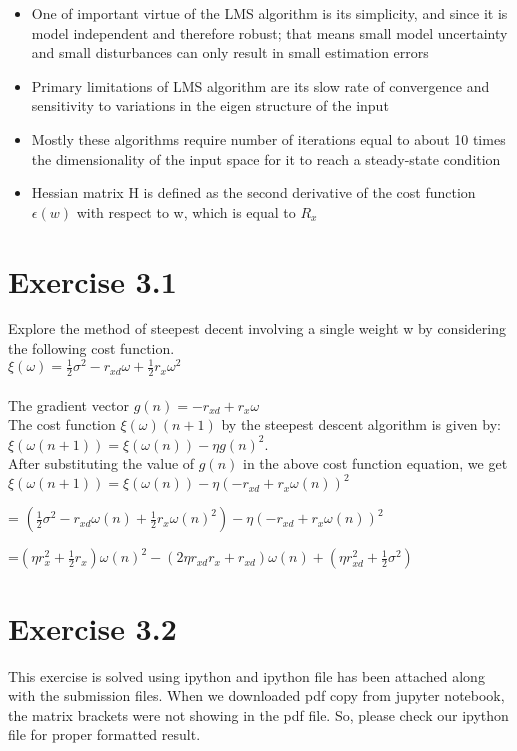 \documentclass[12pt]{article}
\begin{document}
\begin{itemize}
	\item One of important virtue of the LMS algorithm is its simplicity, and since it is model independent and therefore robust; that means small model uncertainty and small disturbances can only result in small estimation errors
	\item Primary limitations of LMS algorithm are its slow rate of convergence and sensitivity to variations in the eigen structure of the input
	\item Mostly these algorithms require number of iterations equal to about 10 times the dimensionality of the input space for it to reach a steady-state condition
	\item Hessian matrix H is defined as the second derivative of the cost function $\epsilon(w)$ with respect to w, which is equal to $R_x$
\end{itemize}
\section{ Exercise 3.1}
Explore the method of steepest decent involving a single weight w by considering the following cost function. \\
$\xi(\omega) = \frac{1}{2} \sigma^2 - r_{xd} \omega + \frac{1}{2}r_x \omega^2$ \\
\\
The gradient vector $g(n) = - r_{xd} + r_x \omega$ \\
\newline The cost function $\xi(\omega) (n+1)$ by the steepest descent algorithm is given by:\\$\xi(\omega (n+1)) = \xi(\omega(n)) - \eta g(n)^2$.\\
\newline After substituting the value of $g(n)$ in the above cost function equation, we get 
\newline $\xi(\omega(n+1)) = \xi(\omega(n)) - \eta (- r_{xd} + r_x \omega(n))^2$

= $ (\frac{1}{2} \sigma^2 - r_{xd} \omega(n) + \frac{1}{2}r_x \omega(n)^2)-  \eta (- r_{xd} + r_x \omega(n))^2$

=$ (\eta r^{2}_x + \frac{1}{2}r_x)\omega(n)^2 -(2\eta r_{xd}r_x  +r_{xd}) \omega(n)+ (\eta r^{2}_{xd} + \frac{1}{2} \sigma^2) $

\section{ Exercise 3.2}
This exercise is solved using ipython and ipython file has been attached along with the submission files. When we downloaded pdf copy from jupyter notebook, the matrix brackets were not showing in the pdf file. So, please check our ipython file for proper formatted result.
\end{document}
